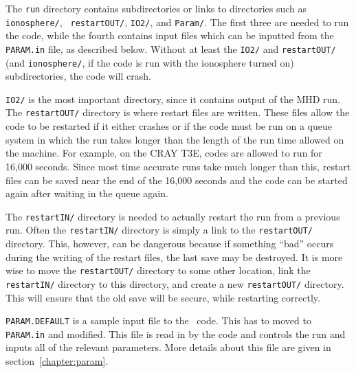 The {\tt run} directory contains subdirectories or links to directories
 such as {\tt ionosphere/}, {\tt
restartOUT/}, {\tt IO2/}, and {\tt Param/}.  The first three are needed
to run the code, while the fourth contains input files which can be
inputted from the {\tt PARAM.in} file, as described below.  Without at
least the {\tt IO2/} and {\tt restartOUT/} (and {\tt ionosphere/}, if
the code is run with the ionosphere turned on) subdirectories, the
code will crash.

{\tt IO2/} is the most important directory, since it contains output
of the MHD run.  The {\tt restartOUT/} directory is where restart
files are written.  These files allow the code to be restarted if it
either crashes or if the code must be run on a queue system in which
the run takes longer than the length of the run time allowed on the
machine.  For example, on the CRAY T3E, codes are allowed to run for
16,000 seconds.  Since most time accurate runs take much longer than
this, restart files can be saved near the end of the 16,000 seconds
and the code can be started again after waiting in the queue again.

The {\tt restartIN/} directory is needed to actually restart the run
from a previous run.  Often the {\tt restartIN/}
directory is simply a link to the {\tt restartOUT/} directory.  This, however,
can be dangerous because if something ``bad'' occurs during the
writing of the restart files, the last save may be destroyed.  It is
more wise to move the {\tt restartOUT/} directory to some other
location, link the {\tt restartIN/} directory to this directory, and
create a new {\tt restartOUT/} directory.  This will ensure that the
old save will be secure, while restarting correctly.

{\tt PARAM.DEFAULT} is a sample input file to the \BATSRUS\ code.  This has
to moved to {\tt PARAM.in} and modified.  This file is read in by the code 
and controls the
run and inputs all of the relevant parameters.  More details about this
file are given in section~\ref{chapter:param}.















